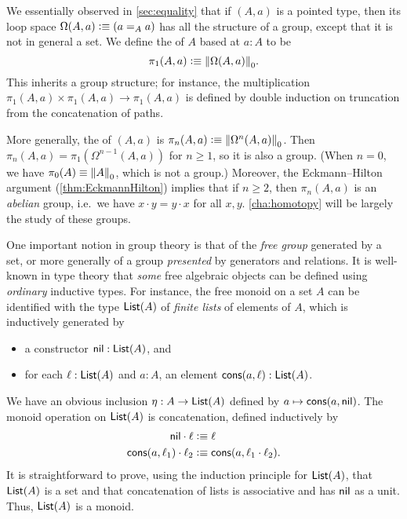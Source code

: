 \begin{eg}\label{thm:homotopy-groups}
  We essentially observed in \autoref{sec:equality} that if $(A,a)$ is a pointed type, then its loop space $\Omega(A,a)\defeq (\id[A]aa)$ has all the structure of a group, except that it is not in general a set.
  We define the 
  of $A$ based at $a:A$ to be
  \[\pi_1(A,a)\defeq \trunc0{\Omega(A,a)}.\]
  This inherits a group structure; for instance, the multiplication $\pi_1(A,a) \times \pi_1(A,a) \to \pi_1(A,a)$ is defined by double induction on truncation from the concatenation of paths.

  More generally, the 
  of $(A,a)$ is $\pi_n(A,a)\defeq \trunc0{\Omega^n(A,a)}$.
  Then $\pi_n(A,a) = \pi_1(\Omega^{n-1}(A,a))$ for $n\ge 1$, so it is also a group.
  (When $n=0$, we have $\pi_0(A) \jdeq \trunc0 A$, which is not a group.)
  Moreover, the Eckmann--Hilton argument (\autoref{thm:EckmannHilton}) implies that if $n\ge 2$, then $\pi_n(A,a)$ is an \emph{abelian} group, i.e.\ we have $x\cdot y = y\cdot x$ for all $x,y$.
  \autoref{cha:homotopy} will be largely the study of these groups.
\end{eg}

%
%
One important notion in group theory is that of the \emph{free group} generated by a set, or more generally of a group \emph{presented} by generators and relations.
It is well-known in type theory that \emph{some} free algebraic objects can be defined using \emph{ordinary} inductive types.
%
%
For instance, the free monoid on a set $A$ can be identified with the type $\lst A$ of \emph{finite lists} of elements of $A$, which is inductively generated by
\begin{itemize}
\item a constructor $\nil:\lst A$, and
\item for each $\ell:\lst A$ and $a:A$, an element $\cons(a,\ell):\lst A$.
\end{itemize}
We have an obvious inclusion $\eta : A\to \lst A$ defined by $a\mapsto \cons(a,\nil)$.
The monoid operation on $\lst A$ is concatenation, defined inductively by
\begin{align*}
  \nil \cdot \ell &\defeq \ell\\
  \cons (a,\ell_1) \cdot \ell_2 &\defeq \cons(a, \ell_1\cdot\ell_2).
\end{align*}
It is straightforward to prove, using the induction principle for $\lst A$, that $\lst A$ is a set and that concatenation of lists is associative
%
and has $\nil$ as a unit.
Thus, $\lst A$ is a monoid.

